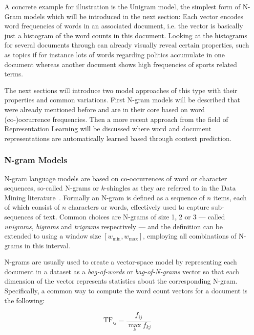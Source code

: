 A concrete example for illustration is the Unigram model, the simplest form of N-Gram models which will be introduced in the next section: Each vector encodes word frequencies of words in an associated document, i.e. the vector is basically just a histogram of the word counts in this document. Looking at the histograms for several documents through can already visually reveal certain properties, such as topics if for instance lots of words regarding politics accumulate in one document whereas another document shows high frequencies of sports related terms.

The next sections will introduce two model approaches of this type with their properties and common variations. First N-gram models will be described that were already mentioned before and are in their core based on word (co-)occurrence frequencies. Then a more recent approach from the field of \gls{Representation Learning} will be discussed where word and document representations are automatically learned based through context prediction.

\subsubsection{N-gram Models}
\label{subs:N-gram Models (Methods)}

N-gram language models are based on co-occurrences of word or character sequences, so-called N-grams or $k$-shingles as they are referred to in the Data Mining literature~\cite[Chapter 3.2, p.~72]{Leskovec:2014aa}. Formally an N-gram is defined as a sequence of $n$ items, each of which consist of $n$ characters or words, effectively used to capture sub-sequences of text. Common choices are N-grams of size 1, 2 or 3 --- called \emph{unigrams}, \emph{bigrams} and \emph{trigrams} respectively --- and the definition can be extended to using a window size $[\textit{w}_{\text{min}}, \textit{w}_{\text{max}}]$, employing all combinations of N-grams in this interval.

N-grams are usually used to create a vector-space model by representing each document in a dataset as a \textit{bag-of-words} or \textit{bag-of-N-grams} vector so that each dimension of the vector represents statistics about the corresponding N-gram. Specifically, a common way to compute the word count vectors for a document is the following:

\begin{equation}
  \text{TF}_{ij} = \frac{f_{ij}}{\max_k f_{kj}}
\end{equation}

